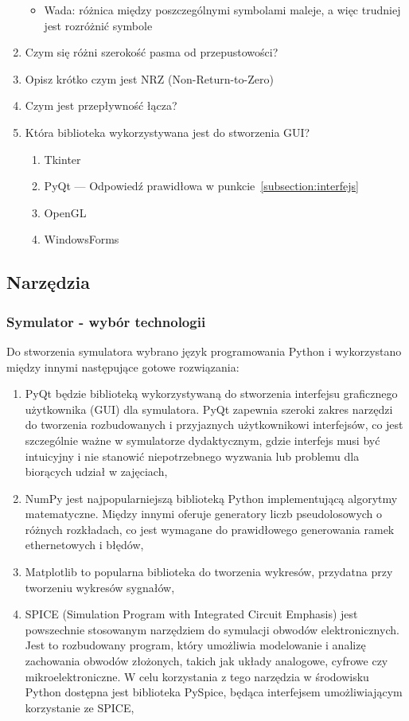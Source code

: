 \begin{enumerate}
\begin{itemize}
        \item Wada: różnica między poszczególnymi symbolami maleje, a więc trudniej jest rozróżnić symbole
    \end{itemize}
    \item Czym się różni szerokość pasma od przepustowości?
    \item Opisz krótko czym jest NRZ (Non-Return-to-Zero)
    \item Czym jest przepływność łącza?
    \item Która biblioteka wykorzystywana jest do stworzenia GUI?
    \begin{enumerate}[label=\Alph*:]
        \item Tkinter
        \item PyQt --- Odpowiedź prawidłowa w punkcie~\ref{subsection:interfejs}
        \item OpenGL
        \item WindowsForms
    \end{enumerate}
\end{enumerate}

\subsection{Narzędzia}

\subsubsection{Symulator - wybór technologii}
Do stworzenia symulatora wybrano język programowania Python i wykorzystano między innymi następujące gotowe rozwiązania:

\begin{enumerate}
    \item PyQt będzie biblioteką wykorzystywaną do stworzenia interfejsu graficznego użytkownika (GUI) dla symulatora. PyQt zapewnia szeroki zakres narzędzi do tworzenia rozbudowanych i przyjaznych użytkownikowi interfejsów, co jest szczególnie ważne w symulatorze dydaktycznym, gdzie interfejs musi być intuicyjny i nie stanowić niepotrzebnego wyzwania lub problemu dla biorących udział w zajęciach,
    \item NumPy jest najpopularniejszą biblioteką Python implementującą algorytmy matematyczne. Między innymi oferuje generatory liczb pseudolosowych o różnych rozkładach, co jest wymagane do prawidłowego generowania ramek ethernetowych i błędów,
    \item  Matplotlib to popularna biblioteka do tworzenia wykresów, przydatna przy tworzeniu wykresów sygnałów,
    \item SPICE (Simulation Program with Integrated Circuit Emphasis) jest powszechnie stosowanym narzędziem do symulacji obwodów elektronicznych. Jest to rozbudowany program, który umożliwia modelowanie i analizę zachowania obwodów złożonych, takich jak układy analogowe, cyfrowe czy mikroelektroniczne. W celu korzystania z tego narzędzia w środowisku Python dostępna jest biblioteka PySpice, będąca interfejsem umożliwiającym korzystanie ze SPICE,
\end{enumerate}

